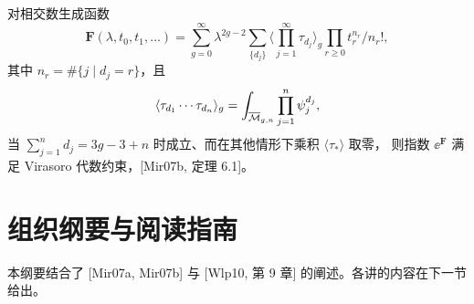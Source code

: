 
对相交数生成函数
\[
\mathbf{F}(\lambda,t_0,t_1,\ldots)
=\sum_{g=0}^{\infty}\lambda^{2g-2}\sum_{\{d_j\}}
\Big\langle\prod_{j=1}^{\infty}\tau_{d_j}\Big\rangle_g
\prod_{r\ge 0}t_r^{n_r}/n_r!,
\]
其中 $n_r=\#\{j\mid d_j=r\}$，且
\[
\langle\tau_{d_1}\cdots\tau_{d_n}\rangle_g
=\int_{\overline{\mathcal{M}}_{g,n}}\prod_{j=1}^{n}\psi_j^{d_j},
\]
当 $\sum_{j=1}^n d_j=3g-3+n$ 时成立、而在其他情形下乘积 $\langle\tau_*\rangle$ 取零，
则指数 $\ee^{\mathbf{F}}$ 满足 Virasoro 代数约束，[Mir07b, 定理 6.1]。


\section{组织纲要与阅读指南}

本纲要结合了 [Mir07a, Mir07b] 与 [Wlp10, 第 9 章] 的阐述。各讲的内容在下一节给出。

